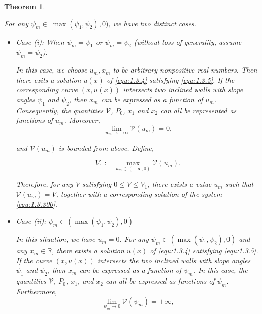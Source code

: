 \documentclass[letterpaper,reqno,10pt,twoside]{amsart}
\newtheorem{theorem}{Theorem}[section]
\theoremstyle{definition}
\theoremstyle{remark}
\begin{document}
    \begin{theorem}{\label{thm:main_2}}

        For any $\psi_{m}\in[\max(\psi_{1},\psi_{2}),0)$, we have two distinct cases. 

        \begin{itemize}
            \item Case (i): When $\psi_m=\psi_{1}$ or $\psi_{m}=\psi_2$ (without loss of generality, assume $\psi_m=\psi_{2}$).
            
            In this case, we choose $u_{m},x_{m}$ to be arbitrary nonpositive real numbers. Then there exits a solution $u(x)$ of \eqref{equ:1.3.4} satisfying \eqref{equ:1.3.5}. If the corresponding curve $(x,u(x))$ intersects two inclined walls with slope angles $\psi_{1}$ and $\psi_{2}$, then $x_{m}$ can be expressed as a function of $u_{m}$. Consequently, the quantities $\mathscr{V}$, $P_{0}$, $x_1$ and $x_2$ can all be represented as functions of $u_m$. Moreover,
            \begin{equation*}
                \lim_{u_{m}\rightarrow -\infty} \mathscr{V}(u_m)=0,
            \end{equation*}

            \noindent and $\mathscr{V}(u_{m})$ is bounded from above. Define, 

            \begin{equation*}
                V_1:=\max_{u_m\in(-\infty,0)} \mathscr{V}(u_m).
            \end{equation*}
            
            \noindent Therefore, for any $V$ satisfying $0\le V\le V_{1}$, there exists a value $u_{m}$ such that $\mathscr{V}(u_{m})=V$, together with a corresponding solution of the system \eqref{equ:1.3.300}.
            
            \item Case (ii): $\psi_{m}\in (\max(\psi_{1},\psi_{2}),0)$
            
            In this situation, we have $u_m=0$. For any $\psi_{m}\in(\max(\psi_{1},\psi_{2}),0)$ and any $x_{m}\in\mathbb{R}$, there exists a solution $u(x)$ of \eqref{equ:1.3.4} satisfying \eqref{equ:1.3.5}. If the curve $(x,u(x))$ intersects the two inclined walls with slope angles $\psi_{1}$ and $\psi_{2}$, then $x_{m}$ can be expressed as a function of $\psi_{m}$. In this case, the quantities $\mathscr{V}$, $P_{0}$, $x_{1}$, and $x_{2}$ can all be expressed as functions of $\psi_{m}$. Furthermore,
            \begin{equation*}
            \lim_{\psi_m\rightarrow 0} \mathscr{V}(\psi_{m})=+\infty,
            \end{equation*}


\end{itemize}
\end{theorem}
\end{document}

